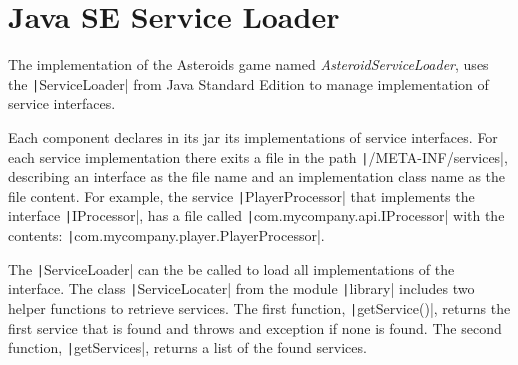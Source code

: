 \section{Java SE Service Loader}

The implementation of the Asteroids game named \emph{AsteroidServiceLoader},
uses the \texttt|ServiceLoader|\cite{bib:service-loader} from Java
Standard Edition to manage implementation of service interfaces.

Each component declares in its jar its implementations of service interfaces.
For each service implementation there exits a file in the path
\texttt|/META-INF/services|,
describing an interface as the file name and an implementation class name as
the file content. 
For example, the service \texttt|PlayerProcessor| that implements the
interface \texttt|IProcessor|,
has a file called \texttt|com.mycompany.api.IProcessor| with the
contents: \texttt|com.mycompany.player.PlayerProcessor|.

The \texttt|ServiceLoader| can the be called to load all
implementations of the interface.
The class \texttt|ServiceLocater| from the module
\texttt|library| includes two helper functions to retrieve services.
The first function, \texttt|getService()|, returns the first service
that is found and throws and exception if none is found.
The second function, \texttt|getServices|, returns a list of the
found services.